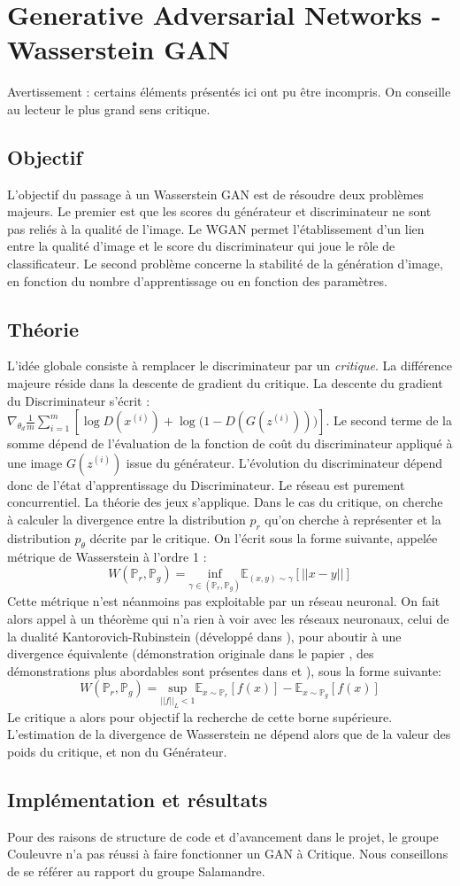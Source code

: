 \chapter{Generative Adversarial Networks - Wasserstein GAN}
Avertissement : certains éléments présentés ici ont pu être incompris. On conseille au lecteur le plus grand sens critique.
\section{Objectif}
L'objectif du passage à un Wasserstein GAN est de résoudre deux problèmes majeurs. Le premier est que les scores du générateur et discriminateur ne sont pas reliés à la qualité de l'image. Le WGAN permet \cite{arjovsky_wasserstein_2017} l'établissement d'un lien entre la qualité d'image et le score du discriminateur qui joue le rôle de classificateur.  
Le second problème concerne la stabilité de la génération d'image, en fonction du nombre d'apprentissage ou en fonction des paramètres.
\section{Théorie}
L'idée globale consiste à remplacer le discriminateur par un \textit{critique}. La différence majeure réside dans la descente de gradient du critique. 
La descente du gradient du Discriminateur s'écrit \cite{goodfellow_generative_2014}:
$\nabla_{\theta_d}\frac{1}{m}\sum_{i=1}^{m}{[\log D(x^{(i)})+\log{(1-D(G(z^{(i)}))})]}$. Le second terme de la somme dépend de l'évaluation de la fonction de coût du discriminateur appliqué à une image $G(z^{(i)})$ issue du générateur. L'évolution du discriminateur dépend donc de l'état d'apprentissage du Discriminateur. Le réseau est purement concurrentiel. La théorie des jeux s'applique.
Dans le cas du critique, on cherche à calculer la divergence entre la distribution $p_{r}$ qu'on cherche à représenter et la distribution $p_{\theta}$ décrite par le critique. On l'écrit sous la forme suivante, appelée métrique de Wasserstein à l'ordre 1 : 
\[
W(\mathbb{P}_r, \mathbb{P}_g)= \underset{\gamma \in (\mathbb{P}_r, \mathbb{P}_g)}{\text{inf}} \mathbb{E}_{(x,y)\sim\gamma} \left[ ||x-y||\right]
\]
Cette métrique n'est néanmoins pas exploitable par un réseau neuronal. On fait alors appel à un théorème qui n'a rien à voir avec les réseaux neuronaux, celui de la dualité Kantorovich-Rubinstein (développé dans \cite{villani_optimal_2008}), pour aboutir à une divergence équivalente (démonstration originale dans le papier \cite{arjovsky_wasserstein_2017}, des démonstrations plus abordables sont présentes dans \cite{irpan_read-through:_2017} et \cite{herrmann_wasserstein_2017}), sous la forme suivante: 
\[
W(\mathbb{P}_r, \mathbb{P}_g) = \underset{||f||_L<1}{\text{sup}}\mathbb{E}_{x\sim\mathbb{P}_r}\left[f(x)\right] - \mathbb{E}_{x\sim\mathbb{P}_g}\left[f(x)\right]
\]
Le critique a alors pour objectif la recherche de cette borne supérieure. L'estimation de la divergence de Wasserstein ne dépend alors que de la valeur des poids du critique, et non du Générateur.

\section{Implémentation et résultats}
Pour des raisons de structure de code et d'avancement dans le projet, le groupe Couleuvre n'a pas réussi à faire fonctionner un GAN à Critique. Nous conseillons de se référer au rapport du groupe Salamandre.